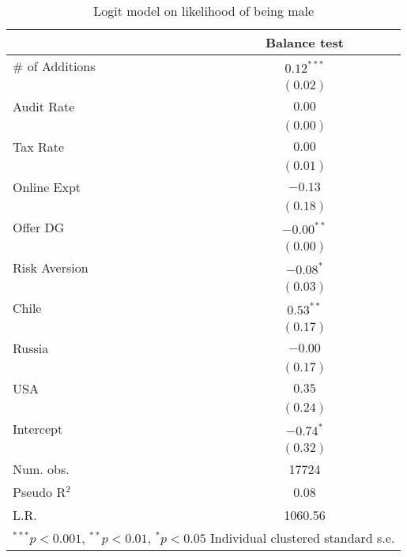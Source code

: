 
\begin{table}
\caption{Logit model on likelihood of being male}
\begin{center}
\begin{tabular}{l c }
\hline
 & Balance test \\
\hline
\# of Additions & $0.12^{***}$ \\
                & $(0.02)$     \\
Audit Rate      & $0.00$       \\
                & $(0.00)$     \\
Tax Rate        & $0.00$       \\
                & $(0.01)$     \\
Online Expt     & $-0.13$      \\
                & $(0.18)$     \\
Offer DG        & $-0.00^{**}$ \\
                & $(0.00)$     \\
Risk Aversion   & $-0.08^{*}$  \\
                & $(0.03)$     \\
Chile           & $0.53^{**}$  \\
                & $(0.17)$     \\
Russia          & $-0.00$      \\
                & $(0.17)$     \\
USA             & $0.35$       \\
                & $(0.24)$     \\
Intercept       & $-0.74^{*}$  \\
                & $(0.32)$     \\
\hline
Num. obs.       & 17724        \\
Pseudo R$^2$    & 0.08         \\
L.R.            & 1060.56      \\
\hline
\multicolumn{2}{l}{\scriptsize{$^{***}p<0.001$, $^{**}p<0.01$, $^*p<0.05$ Individual clustered standard s.e.}}
\end{tabular}
\label{table:balance_test}
\end{center}
\end{table}
